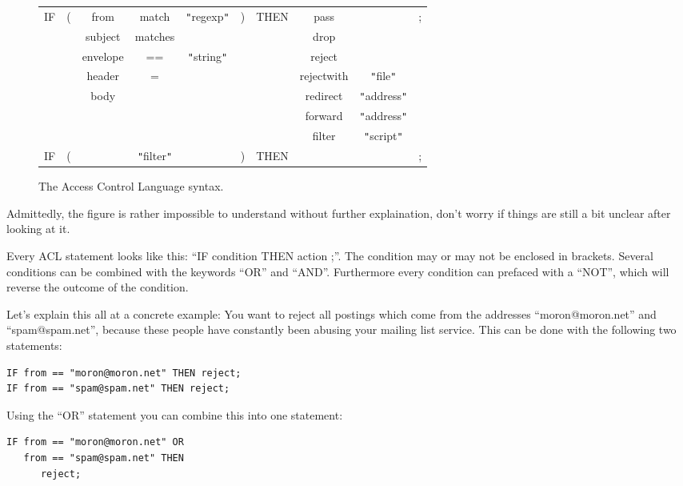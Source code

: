 \documentclass[a4paper]{report}
\begin{document}
\begin{figure}[bth]
\begin{center}
\begin{tabular}{cccccccccc}
IF & ( & from & match & {\tt "}regexp{\tt "} & ) & THEN & pass & & ; \\
   &   & subject & matches &                   &   &      & drop & & \\
   &   & envelope & ==     & {\tt "}string{\tt "}          &   &      & reject & & \\
   &   & header   & =     &                & &     & rejectwith & {\tt "}file{\tt "}  & \\
   &   & body     &       &                & &     & redirect   & {\tt "}address{\tt "} & \\
   &   &      &       &                &   &      & forward    & {\tt "}address{\tt "} & \\
   &   &      &       &                &   &      & filter     & {\tt "}script{\tt "} & \\
IF & ( &  & {\tt "}filter{\tt "} &  & ) & THEN &  & & ; \\
\end{tabular}
\caption{The Access Control Language syntax.}
\label{acl syntax}
\end{center}
\end{figure}

Admittedly, the figure is rather impossible to understand without
further explaination, don't worry if things are still a bit unclear
after looking at it.

Every ACL statement looks like this: ``IF condition THEN action ;''.
The condition may or may not be enclosed in brackets. Several
conditions can be combined with the keywords ``OR'' and ``AND''.
Furthermore every condition can prefaced with a ``NOT'', which will
reverse the outcome of the condition.

Let's explain this all at a concrete example: You want to reject all
postings which come from the addresses ``moron@moron.net'' and
``spam@spam.net'', because these people have constantly been abusing
your mailing list service. This can be done with the following two
statements:
\begin{verbatim}
IF from == "moron@moron.net" THEN reject;
IF from == "spam@spam.net" THEN reject;
\end{verbatim}

Using the ``OR'' statement you can combine this into one statement:
\begin{verbatim}
IF from == "moron@moron.net" OR
   from == "spam@spam.net" THEN
      reject;
\end{verbatim}
\end{document}
